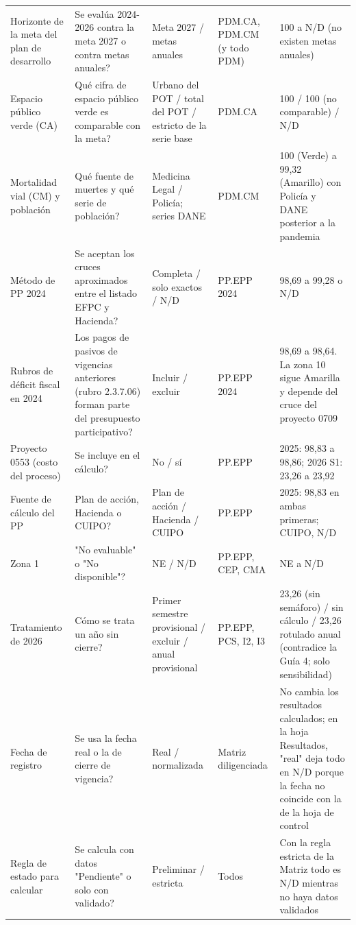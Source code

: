 \documentclass[11pt,letterpaper]{article}
\begin{document}
{\begin{xltabular}{\linewidth}{L{2.6cm}L{3.1cm}L{2.5cm}L{2.4cm}Y}
Horizonte de la meta del plan de desarrollo & \textquestiondown{}Se evalúa 2024-2026 contra la meta 2027 o contra metas anuales? & Meta 2027 / metas anuales & PDM.CA, PDM.CM (y todo PDM) & 100 a N/D (no existen metas anuales) \\
Espacio público verde (CA) & \textquestiondown{}Qué cifra de espacio público verde es comparable con la meta? & Urbano del POT / total del POT / estricto de la serie base & PDM.CA & 100 / 100 (no comparable) / N/D \\
Mortalidad vial (CM) y población & \textquestiondown{}Qué fuente de muertes y qué serie de población? & Medicina Legal / Policía; series DANE & PDM.CM & 100 (Verde) a 99,32 (Amarillo) con Policía y DANE posterior a la pandemia \\
Método de PP 2024 & \textquestiondown{}Se aceptan los cruces aproximados entre el listado EFPC y Hacienda? & Completa / solo exactos / N/D & PP.EPP 2024 & 98,69 a 99,28 o N/D \\
Rubros de déficit fiscal en 2024 & \textquestiondown{}Los pagos de pasivos de vigencias anteriores (rubro 2.3.7.06) forman parte del presupuesto participativo? & Incluir / excluir & PP.EPP 2024 & 98,69 a 98,64. La zona 10 sigue Amarilla y depende del cruce del proyecto 0709 \\
Proyecto 0553 (costo del proceso) & \textquestiondown{}Se incluye en el cálculo? & No / sí & PP.EPP & 2025: 98,83 a 98,86; 2026 S1: 23,26 a 23,92 \\
Fuente de cálculo del PP & \textquestiondown{}Plan de acción, Hacienda o CUIPO? & Plan de acción / Hacienda / CUIPO & PP.EPP & 2025: 98,83 en ambas primeras; CUIPO, N/D \\
Zona 1 & \textquestiondown{}"No evaluable" o "No disponible"? & NE / N/D & PP.EPP, CEP, CMA & NE a N/D \\
Tratamiento de 2026 & \textquestiondown{}Cómo se trata un año sin cierre? & Primer semestre provisional / excluir / anual provisional & PP.EPP, PCS, I2, I3 & 23,26 (sin semáforo) / sin cálculo / 23,26 rotulado anual (contradice la Guía 4; solo sensibilidad) \\
Fecha de registro & \textquestiondown{}Se usa la fecha real o la de cierre de vigencia? & Real / normalizada & Matriz diligenciada & No cambia los resultados calculados; en la hoja Resultados, "real" deja todo en N/D porque la fecha no coincide con la de la hoja de control \\
Regla de estado para calcular & \textquestiondown{}Se calcula con datos "Pendiente" o solo con validado? & Preliminar / estricta & Todos & Con la regla estricta de la Matriz todo es N/D mientras no haya datos validados \\

\end{xltabular}}
\end{document}
